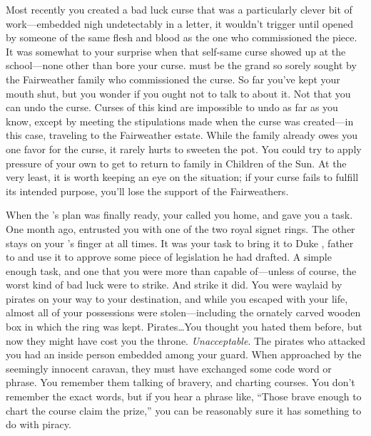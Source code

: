 \documentclass[char]{GL2020}
\begin{document}
Most recently you created a bad luck curse that was a particularly clever bit of work---embedded nigh undetectably in a letter, it wouldn't trigger until opened by someone of the same flesh and blood as the one who commissioned the piece. It was somewhat to your surprise when that self-same curse showed up at the school---none other than \cInitiate{\full} bore your curse. \cInitiate{\They} must be the grand\cInitiate{\child} so sorely sought by the Fairweather family who commissioned the curse. So far you've kept your mouth shut, but you wonder if you ought not to talk to \cInitiate{} about it. Not that you can undo the curse. Curses of this kind are impossible to undo as far as you know, except by meeting the stipulations made when the curse was created---in this case, traveling to the Fairweather estate. While the family already owes you one favor for the curse, it rarely hurts to sweeten the pot. You could try to apply pressure of your own to get \cInitiate{} to return to \cInitiate{\their} family in Children of the Sun. At the very least, it is worth keeping an eye on the situation; if your curse fails to fulfill its intended purpose, you'll lose the support of the Fairweathers.

When the \cQueen{\Majesty}'s plan was finally ready, your \cQueen{\parent} called you home, and gave you a task. One month ago, \cQueen{\They} entrusted you with one of the two royal signet rings. The other stays on your \cQueen{\parent}'s finger at all times. It was your task to bring it to Duke \cChupStudent{\formal}, father to \cChupStudent{\full} and use it to approve some piece of legislation he had drafted. A simple enough task, and one that you were more than capable of---unless of course, the worst kind of bad luck were to strike. And strike it did. You were waylaid by pirates on your way to your destination, and while you escaped with your life, almost all of your possessions were stolen---including the ornately carved wooden box in which the ring was kept. Pirates\ldots{}You thought you hated them before, but now they might have cost you the throne. \emph{Unacceptable}. The pirates who attacked you had an inside person embedded among your guard. When approached by the seemingly innocent caravan, they must have exchanged some code word or phrase. You remember them talking of bravery, and charting courses. You don't remember the exact words, but if you hear a phrase like, ``Those brave enough to chart the course claim the prize,'' you can be reasonably sure it has something to do with piracy.
\end{document}
